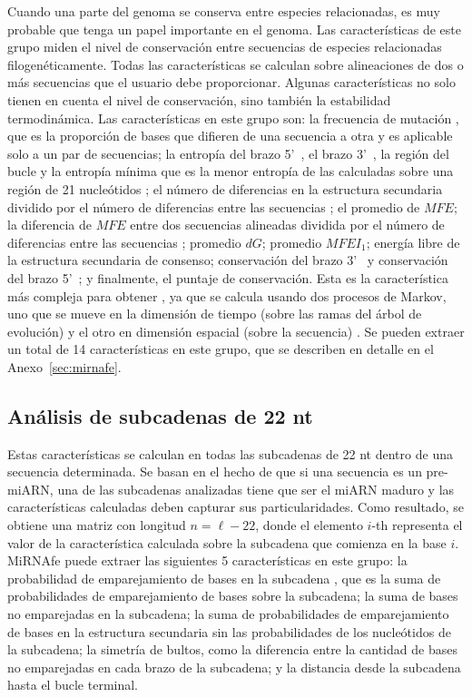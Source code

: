 Cuando una parte del genoma se conserva entre especies relacionadas, es muy probable que tenga un papel importante en el genoma. Las características de este
grupo miden el nivel de conservación entre secuencias de especies relacionadas filogenéticamente. Todas las características se calculan sobre alineaciones
de dos o más secuencias que el usuario debe proporcionar. Algunas características no solo tienen en cuenta el nivel de conservación, sino también la
estabilidad termodinámica. Las características en este grupo son: la frecuencia de mutación \citep{huang2007mirfinder}, que es la proporción de bases que difieren de
una secuencia a otra y es aplicable solo a un par de secuencias; la entropía del brazo 5\textquoteright~, el brazo 3\textquoteright~, la región del bucle y
la entropía mínima que es la menor entropía de las calculadas sobre una región de 21 nucleótidos \citep{hertel2006hairpins}; el número de diferencias en la
estructura secundaria dividido por el número de diferencias entre las secuencias \citep{huang2007mirfinder}; el promedio de $MFE$; la diferencia de $MFE$ entre dos
secuencias alineadas dividida por el número de diferencias entre las secuencias \citep{huang2007mirfinder}; promedio $dG$; promedio $ MFEI_{1} $; energía libre de la
estructura secundaria de consenso; conservación del brazo 3\textquoteright~ y conservación del brazo 5\textquoteright~; y finalmente, el puntaje de
conservación. Esta es la característica más compleja para obtener \citep{terai2007mirrim}, ya que se calcula usando dos procesos de Markov, uno que se mueve en la
dimensión de tiempo (sobre las ramas del árbol de evolución) y el otro en dimensión espacial (sobre la secuencia) . Se pueden extraer un total de 14
características en este grupo, que se describen en detalle en el Anexo~\ref{sec:mirnafe}.

\subsection{Análisis de subcadenas de 22 nt}

Estas características se calculan en todas las subcadenas de 22 nt dentro de una secuencia determinada. Se basan en el hecho de que si una secuencia es un
pre-miARN, una de las subcadenas analizadas tiene que ser el miARN maduro y las características calculadas deben capturar sus particularidades. Como
resultado, se obtiene una matriz con longitud $ n = \ell - 22 $, donde el elemento $i$-th representa el valor de la característica calculada sobre la
subcadena que comienza en la base $i$. MiRNAfe puede extraer las siguientes 5 características en este grupo: la probabilidad de emparejamiento de bases en la
subcadena \citep{lim2003}, que es la suma de probabilidades de emparejamiento de bases sobre la subcadena; la suma de bases no emparejadas en la subcadena; la
suma de probabilidades de emparejamiento de bases en la estructura secundaria sin las probabilidades de los nucleótidos de la subcadena; la simetría de
bultos, como la diferencia entre la cantidad de bases no emparejadas en cada brazo de la subcadena; y la distancia desde la subcadena hasta el bucle terminal.

